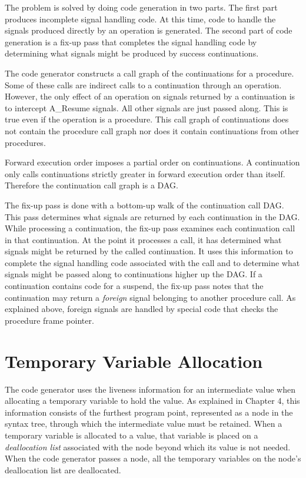 The problem is solved by doing code generation in two parts. The first
part produces incomplete signal handling code. At this time, code to
handle the signals produced directly by an operation is generated. The
second part of code generation is a fix-up pass that completes the
signal handling code by determining what signals might be produced by
success continuations.

The code generator constructs a call graph of the continuations for a
procedure. Some of these calls are indirect calls to a continuation
through an operation. However, the only effect of an operation on
signals returned by a continuation is to intercept A\_Resume
signals. All other signals are just passed along. This is true even if
the operation is a procedure. This call graph of continuations does
not contain the procedure call graph nor does it contain continuations
from other procedures.

Forward execution order imposes a partial order on continuations. A
continuation only calls continuations strictly greater in forward
execution order than itself. Therefore the continuation call graph is
a DAG.

The fix-up pass is done with a bottom-up walk of the continuation call
DAG. This pass determines what signals are returned by each
continuation in the DAG. While processing a continuation, the fix-up
pass examines each continuation call in that continuation. At the
point it processes a call, it has determined what signals might be
returned by the called continuation. It uses this information to
complete the signal handling code associated with the call and to
determine what signals might be passed along to continuations higher
up the DAG. If a continuation contains code for a suspend, the fix-up
pass notes that the continuation may return a \textit{foreign} signal
belonging to another procedure call. As explained above, foreign
signals are handled by special code that checks the procedure frame
pointer.


\section{Temporary Variable Allocation}

The code generator uses the liveness information for an intermediate
value when allocating a temporary variable to hold the value. As
explained in Chapter 4, this information consists of the furthest
program point, represented as a node in the syntax tree, through which
the intermediate value must be retained. When a temporary variable is
allocated to a value, that variable is placed on a
\textit{deallocation list} associated with the node beyond which its
value is not needed. When the code generator passes a node, all the
temporary variables on the node's deallocation list are deallocated.

